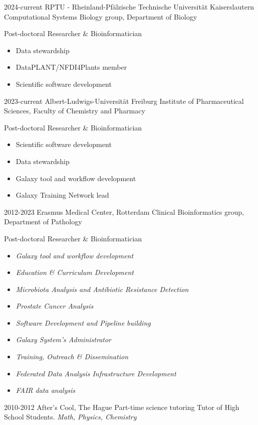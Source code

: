 \documentclass[]{shiltemann-cv}
\begin{document}
\begin{entrylist}
 \entry
    {2024-current}
    {RPTU - Rheinland-Pfälzische Technische Universität Kaiserslautern}
    {Computational Systems Biology group, Department of Biology}
    {Post-doctoral Researcher \& Bioinformatician
    \begin{itemize}
      \item Data stewardship
      \item DataPLANT/NFDI4Plants member
      \item Scientific software development
    \end{itemize}}


 \entry
    {2023-current}
    {Albert-Ludwigs-Universität Freiburg}
    {Institute of Pharmaceutical Sciences, Faculty of Chemistry and Pharmacy}
    {Post-doctoral Researcher \& Bioinformatician
    \begin{itemize}
      \item Scientific software development
      \item Data stewardship
      \item Galaxy tool and workflow development
      \item Galaxy Training Network lead
    \end{itemize}}
 \entry
    {2012-2023}
    {Erasmus Medical Center, Rotterdam}
    {Clinical Bioinformatics group, Department of Pathology}
    {Post-doctoral Researcher \& Bioinformatician
     \begin{itemize}
       \item \emph{Galaxy tool and workflow development}
       \item \emph{Education \& Curriculum Development}
       \item \emph{Microbiota Analysis and Antibiotic Resistance Detection}
       \item \emph{Prostate Cancer Analysis}
       \item \emph{Software Development and Pipeline building}
       \item \emph{Galaxy System's Administrator}
       \item \emph{Training, Outreach \& Dissemination}
       \item \emph{Federated Data Analysis Infrastructure Development}
       \item \emph{FAIR data analysis}
     \end{itemize}}
  \entry
    {2010-2012}
    {After's Cool, The Hague}
    {Part-time science tutoring}
    {Tutor of High School Students. \emph{Math, Physics, Chemistry}}
\end{entrylist}
\end{document}
